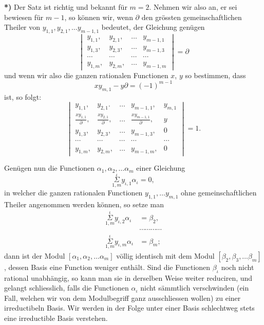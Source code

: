 \documentclass{article}
\begin{document}
\textbf{*)} Der Satz ist richtig und bekannt für $m = 2$. Nehmen wir also an, er sei bewiesen für $m-1$, so können wir, wenn $\partial$ den grössten gemeinschaftlichen Theiler von $y_{1,1}, y_{2,1}, \ldots y_{m-1,1}$ bedeutet, der Gleichung genügen
\[ \begin{vmatrix} y_{1,1}, & y_{2,1}, & \ldots & y_{m-1,1} \\ y_{1,3}, & y_{2,3}, & \ldots & y_{m-1,3} \\ \cdots & \cdots & \cdots & \cdots \\ y_{1,m}, & y_{2,m}, & \ldots & y_{m-1,m} \end{vmatrix} = \partial \]
und wenn wir also die ganzen rationalen Functionen $x$, $y$ so bestimmen, dass
\[ xy_{m,1} - y\partial = (-1)^{m-1} \]
ist, so folgt:
\[ \begin{vmatrix} y_{1,1}, & y_{2,1}. & \ldots & y_{m-1,1}, & y_{m,1} \\ \frac{xy_{1,1}}{\partial}, & \frac{xy_{2,1}}{\partial}, & \ldots & \frac{xy_{m-1,1}}{\partial}, & y \\ y_{1,3}, & y_{2,3}, & \ldots & y_{m-1,3}, & 0 \\ \cdots & \cdots & \cdots & \cdots & \cdots \\ y_{1,m}, & y_{2,m}, & \ldots & y_{m-1,m}, & 0 \end{vmatrix} = 1. \]


Genügen nun die Functionen $\alpha_{1}, \alpha_{2}, \ldots \alpha_{m}$ einer Gleichung
\[ \overset{\iota}{\underset{1,m}{\Sigma}} y_{\iota,1}\alpha_{\iota} = 0, \]
in welcher die ganzen rationalen Functionen $y_{1,1}, \ldots y_{m,1}$ ohne gemeinschaftlichen Theiler angenommen werden können, so setze man
\[ \begin{aligned} \overset{\iota}{\underset{1,m}{\Sigma}} y_{\iota,2}\alpha_{\iota} &= \beta_{2}, \\ &\cdots\cdots\cdots\cdots \\ \overset{\iota}{\underset{1,m}{\Sigma}} y_{\iota,m}\alpha_{\iota} &= \beta_{m}; \end{aligned} \]
dann ist der Modul $[\alpha_{1}, \alpha_{2}, \ldots \alpha_{m}]$ völlig identisch mit dem Modul $[\beta_{2}, \beta_{3}, \ldots \beta_{m}]$, dessen Basis eine Function weniger enthält. Sind die Functionen $\beta_{\iota}$ noch nicht rational unabhängig, so kann man sie in derselben Weise weiter reduciren, und gelangt schliesslich, falls die Functionen $\alpha_{\iota}$ nicht sämmtlich verschwinden (ein Fall, welchen wir von dem Modulbegriff ganz ausschliessen wollen) zu einer irreductibeln Basis. Wir werden in der Folge unter einer Basis schlechtweg stets eine irreductible Basis verstehen.
\end{document}
